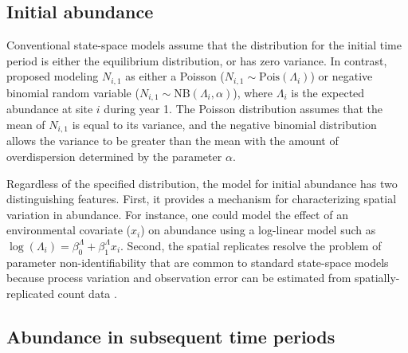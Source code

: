 \documentclass[12pt,english]{article}
\begin{document}
\begin{spacing}{1.9}
\begin{flushleft}
\subsection*{Initial abundance}

Conventional state-space models assume that the
distribution for the initial time period 
is either the equilibrium
distribution, or has zero variance.
In contrast, \citet{dail_madsen:2011} proposed modeling $N_{i,1}$
as either a Poisson ($N_{i,1} \sim \mathrm{Pois}(\Lambda_i)$) or 
negative binomial random variable ($N_{i,1} \sim \mathrm{NB}(\Lambda_i, \alpha)$),
where $\Lambda_i$ is the expected abundance at site $i$ during
year 1.
The Poisson distribution assumes that the mean of $N_{i,1}$ is
equal to its variance, and the negative binomial distribution allows the
variance to be greater than the mean with the amount of
overdispersion determined by the parameter $\alpha$.

Regardless of the specified distribution, the model for initial
abundance has two distinguishing features. First, it provides a
mechanism for characterizing spatial variation in abundance. For
instance, one could model the effect of an environmental
covariate ($x_i$) on abundance using a log-linear
model such as $\log(\Lambda_i) = \beta^{\Lambda}_0 +
\beta^{\Lambda}_1
x_{i}$. Second, the spatial
replicates resolve the
problem of parameter non-identifiability that are common to
standard state-space models because
process variation and observation error can be estimated from
spatially-replicated count data \citep{royle:2004biom}. %

\subsection*{Abundance in subsequent time periods}


\end{flushleft}
\end{spacing}
\end{document}
